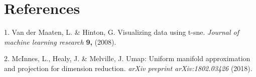 \documentclass[]{article}
\begin{document}
\hypertarget{references}{%
\section*{References}\label{references}}

\hypertarget{refs}{}
\leavevmode\hypertarget{ref-van2008visualizing}{}%
1. Van der Maaten, L. \& Hinton, G. Visualizing data using t-sne. \emph{Journal of machine learning research} \textbf{9,} (2008).

\leavevmode\hypertarget{ref-mcinnes2018umap}{}%
2. McInnes, L., Healy, J. \& Melville, J. Umap: Uniform manifold approximation and projection for dimension reduction. \emph{arXiv preprint arXiv:1802.03426} (2018).
\end{document}
